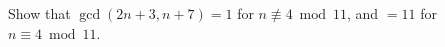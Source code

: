 Show that $\gcd(2n + 3, n + 7) = 1$ for $n \not\equiv 4 \bmod 11$, and $= 11$ for $n \equiv 4 \bmod 11$.

